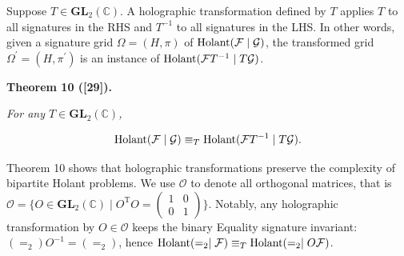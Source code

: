 Suppose $T\in\textbf{GL}_{2}(\mathbb{C})$. A holographic transformation defined by $T$ applies $T$ to all signatures in the RHS and $T^{-1}$ to all signatures in the LHS. In other words, given a signature grid $\Omega=(H,\pi)$ of $\textup{{Holant}}(\mathcal{F}\mid\mathcal{G})$, the transformed grid $\Omega^{\prime}=(H,\pi^{\prime})$ is an instance of $\textup{{Holant}}(\mathcal{F}T^{-1}\mid T\mathcal{G})$.\par





\par\medskip\noindent\textbf{
\textbf{Theorem 10}\textbf{ }([29])\textbf{.}
}\par



\emph{For any $T\in\mathbf{GL}_{2}(\mathbb{C})$,}\par


\[\begin{gathered}
\textup{{Holant}}(\mathcal{F}\mid\mathcal{G})\equiv_{T}\textup{{Holant}}(\mathcal{F}T^{-1}\mid T\mathcal{G}).
\end{gathered}\]






Theorem 10 shows that holographic transformations preserve the complexity of bipartite Holant problems. We use $\mathscr{O}$ to denote all orthogonal matrices, that is $\mathscr{O}=\{O\in\textbf{GL}_{2}(\mathbb{C})\mid O^{\mathrm{T}}O=\begin{pmatrix}1&0\\
0&1\end{pmatrix}\}.$ Notably, any holographic transformation by $O\in\mathscr{O}$ keeps the binary Equality signature invariant: $(=_{2})O^{-1}=(=_{2})$, hence $\textup{{Holant}}(=_{2}\mid\mathcal{F})\equiv_{T}\textup{{Holant}}(=_{2}\mid O\mathcal{F})$.\par




